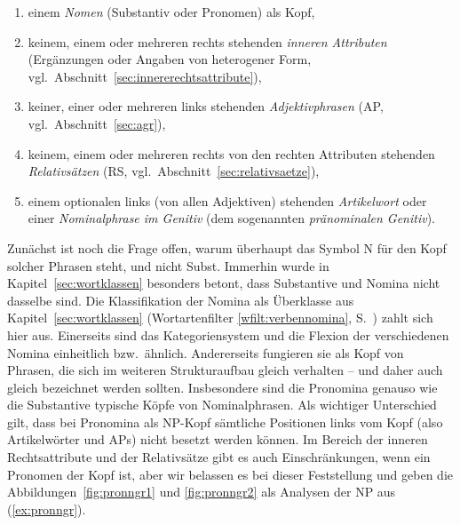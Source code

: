 \begin{enumerate}\Lf
  \item einem \textit{Nomen} (Substantiv oder Pronomen) als Kopf,
  \item keinem, einem oder mehreren rechts stehenden \textit{inneren Attributen} (Ergänzungen oder Angaben von heterogener Form, vgl.\ Abschnitt~\ref{sec:innererechtsattribute}),
  \item keiner, einer oder mehreren links stehenden \textit{Adjektivphrasen} (AP, vgl.\ Abschnitt~\ref{sec:agr}),
  \item keinem, einem oder mehreren rechts von den rechten Attributen stehenden \textit{Relativsätzen} (RS, vgl.\ Abschnitt~\ref{sec:relativsaetze}),
  \item einem optionalen links (von allen Adjektiven) stehenden \textit{Artikelwort} oder einer \textit{Nominalphrase im Genitiv} (dem sogenannten \textit{pränominalen Genitiv}).
\end{enumerate}


Zunächst ist noch die Frage offen, warum überhaupt das Symbol N für den Kopf solcher Phrasen steht, und nicht Subst.
Immerhin wurde in Kapitel~\ref{sec:wortklassen} besonders betont, dass Substantive und Nomina nicht dasselbe sind.
Die Klassifikation der Nomina als Überklasse aus Kapitel~\ref{sec:wortklassen} (Wortartenfilter \ref{wfilt:verbennomina}, S.~\pageref{wfilt:verbennomina}) zahlt sich hier aus.
Einerseits sind das Kategoriensystem und die Flexion der verschiedenen Nomina einheitlich bzw.\ ähnlich.
Andererseits fungieren sie als Kopf von Phrasen, die sich im weiteren Strukturaufbau gleich verhalten -- und daher auch gleich bezeichnet werden sollten.
Insbesondere sind die Pronomina genauso wie die Substantive typische Köpfe von Nominalphrasen.
Als wichtiger Unterschied gilt, dass bei Pronomina als NP-Kopf sämtliche Positionen links vom Kopf (also Artikelwörter und APs) nicht besetzt werden können.
Im Bereich der inneren Rechtsattribute und der Relativsätze gibt es auch Einschränkungen, wenn ein Pronomen der Kopf ist, aber wir belassen es bei dieser Feststellung und geben die Abbildungen~\ref{fig:pronngr1} und \ref{fig:pronngr2} als Analysen der NP aus (\ref{ex:pronngr}).

\begin{exe}
  \ex\label{ex:pronngr}
  \begin{xlist}
  \end{xlist}
\end{exe}

